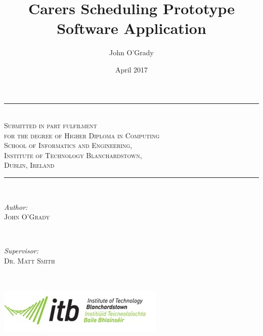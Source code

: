 \documentclass[a4paper,12pt]{article}
\begin{document}
\begin{titlepage}

\newcommand{\HRule}{\rule{\linewidth}{0.5mm}}

\title {Carers Scheduling Prototype Software Application}

\author{John O'Grady}
\date{April 2017}

\maketitle

\thispagestyle{empty}

\begin{center}
\HRule \\[0.4cm]
\textsc{\large Submitted in part fulfilment
 \\for the degree of
Higher Diploma in Computing
\\School of Informatics and Engineering,
\\Institute of Technology Blanchardstown,
\\Dublin, Ireland
} 
\end{center}

\HRule \\[2cm]


\begin{minipage}{0.4\textwidth}
\begin{flushleft} \large
\emph{Author:}\\
 \textsc{John O'Grady} 
\end{flushleft}
\end{minipage}
~
\begin{minipage}{0.4\textwidth}
\begin{flushright} \large
\emph{Supervisor:} \\
\textsc{Dr. Matt Smith} 
\end{flushright}
\end{minipage}\\[2cm]

\begin{center}
\includegraphics{itb_logo.jpg}
\end{center}

\end{titlepage}
\end{document}
